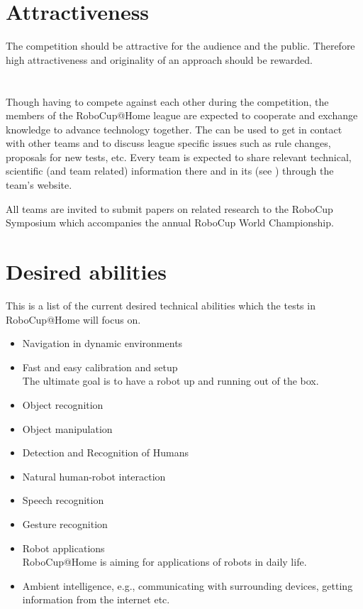 \section{Attractiveness}
\label{concept:attractiveness}
The competition should be attractive for the audience and the public. Therefore high attractiveness and originality of an approach should be rewarded.

\section{}
\label{concept:community}
Though having to compete against each other during the competition, the members of the RoboCup@Home league are expected to cooperate and exchange knowledge to advance technology together. The  can be used to get in contact with other teams and to discuss league specific issues such as rule changes, proposals for new tests, etc.
Every team is expected to share relevant technical, scientific (and team related) information there and in its  (see ) through the team's website.

All teams are invited to submit papers on related research to the RoboCup Symposium which accompanies the annual RoboCup World Championship.

\section{Desired abilities}
\label{concept:desired_abilities}
This is a list of the current desired technical abilities which the tests in RoboCup@Home will focus on.

\begin{itemize}
\item Navigation in dynamic environments
\item Fast and easy calibration and setup \\ The ultimate goal is to have a robot up and running out of the box.
\item Object recognition
\item Object manipulation
\item Detection and Recognition of Humans
\item Natural human-robot interaction
\item Speech recognition
\item Gesture recognition
\item Robot applications \\ RoboCup@Home is aiming for applications of robots in daily life.
\item Ambient intelligence, e.g., communicating with surrounding devices, getting information from the internet etc.
\end{itemize}


